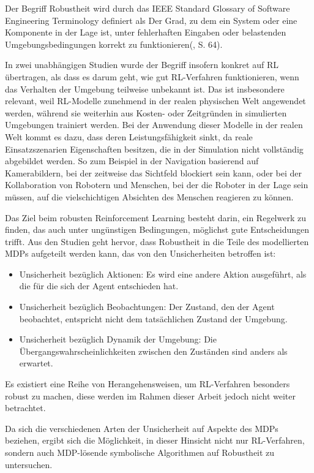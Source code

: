 \label{robustheit}

Der Begriff Robustheit wird durch das IEEE Standard Glossary of Software Engineering Terminology definiert als \glqq Der Grad, zu dem ein System oder eine Komponente in der Lage ist, unter fehlerhaften Eingaben oder belastenden Umgebungsbedingungen korrekt zu funktionieren\grqq{}(\cite{IEEE.1990}, S. 64).

In zwei unabhängigen Studien wurde der Begriff insofern konkret auf RL übertragen, als dass es darum geht, wie gut RL-Verfahren funktionieren, wenn das Verhalten der Umgebung teilweise unbekannt ist. Das ist insbesondere relevant, weil RL-Modelle zunehmend in der realen physischen Welt angewendet werden, während sie weiterhin aus Kosten- oder Zeitgründen in simulierten Umgebungen trainiert werden. Bei der Anwendung dieser Modelle in der realen Welt kommt es dazu, dass deren Leistungsfähigkeit sinkt, da reale Einsatzszenarien Eigenschaften besitzen, die in der Simulation nicht vollständig abgebildet werden. So zum Beispiel in der Navigation basierend auf Kamerabildern, bei der zeitweise das Sichtfeld blockiert sein kann, oder bei der Kollaboration von Robotern und Menschen, bei der die Roboter in der Lage sein müssen, auf die vielschichtigen Absichten des Menschen reagieren zu können\cite{Moos.2022}\cite{Ni.2021}.

Das Ziel beim robusten Reinforcement Learning besteht darin, ein Regelwerk zu finden, das auch unter ungünstigen Bedingungen, möglichst gute Entscheidungen trifft. Aus den Studien geht hervor, dass Robustheit in die Teile des modellierten MDPs aufgeteilt werden kann, das von den Unsicherheiten betroffen ist:

\begin{itemize}
	\item Unsicherheit bezüglich Aktionen: Es wird eine andere Aktion ausgeführt, als die für die sich der Agent entschieden hat.
	\item Unsicherheit bezüglich Beobachtungen: Der Zustand, den der Agent beobachtet, entspricht nicht dem tatsächlichen Zustand der Umgebung.
	\item Unsicherheit bezüglich Dynamik der Umgebung: Die Übergangswahrscheinlichkeiten zwischen den Zuständen sind anders als erwartet.
\end{itemize}

Es existiert eine Reihe von Herangehensweisen, um RL-Verfahren besonders robust zu machen, diese werden im Rahmen dieser Arbeit jedoch nicht weiter betrachtet\cite{Moos.2022}\cite{Ni.2021}.

Da sich die verschiedenen Arten der Unsicherheit auf Aspekte des MDPs beziehen, ergibt sich die Möglichkeit, in dieser Hinsicht nicht nur RL-Verfahren, sondern auch MDP-lösende symbolische Algorithmen auf Robustheit zu untersuchen.

